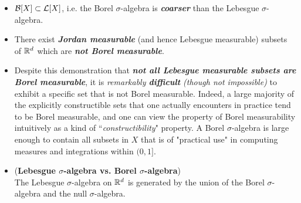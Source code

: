 \documentclass[11pt]{article}
\begin{document}
\begin{itemize}
\item \begin{remark}
${\mathcal B}[X] \subset {\mathcal L}[X]$, i.e. the Borel $\sigma$-algebra is \emph{\textbf{coarser}} than the Lebesgue $\sigma$-algebra.
\end{remark}

\item \begin{remark}
There exist \emph{\textbf{Jordan measurable}} (and hence Lebesgue measurable) subsets of ${\mathbb R}^d$ which are \emph{\textbf{not Borel measurable}}. \citep{tao2011introduction}
\end{remark}

\item \begin{remark}
Despite this demonstration that \emph{\textbf{not all Lebesgue measurable subsets are Borel measurable}}, it is \emph{remarkably \textbf{difficult} (though not impossible)} to exhibit a specific set that is not Borel measurable. Indeed, a large majority of the explicitly constructible sets that one actually encounters in practice tend to be Borel measurable, and one can view the property of Borel measurability intuitively as a kind of ``\emph{constructibility}" property.  A Borel $\sigma$-algebra is large enough to contain all subsets in $X$ that is of "practical use" in computing measures and integrations within $(0,1]$. 
\end{remark}

\item \begin{proposition} (\textbf{Lebesgue $\sigma$-algebra vs. Borel $\sigma$-algebra})\\
The Lebesgue $\sigma$-algebra on ${\mathbb R}^d$ is generated by the union of the Borel $\sigma$-algebra and the null $\sigma$-algebra.
\end{proposition}


\end{itemize}
\end{document}
